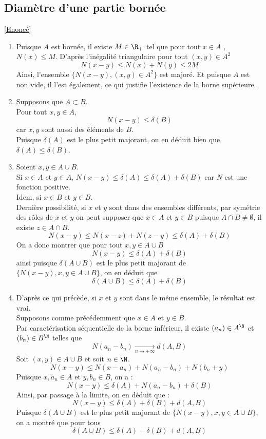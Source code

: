 \documentclass{book}
\begin{document}
	\subsection{Diamètre d'une partie bornée}\label{sec:diametre-dune-partie-bornee}
		\textcolor{blue}{\hyperref[Diamètre d'une partie bornée]{[Enoncé]}}\\
		\begin{enumerate}[leftmargin=*]
			\item Puisque $A$ est bornée, il existe $M\in\R_+$ tel que pour tout $x\in A$ , $N(x)\leq M$.
			D'après l'inégalité triangulaire pour tout $(x,y)\in A^2$
			\[N(x-y)\leq N(x) + N(y)\leq 2M\]
			Ainsi, l'ensemble $\{N(x-y), (x,y)\in A^2\}$ est majoré. Et puisque $A$ est non vide, il l'est également, ce qui justifie l'existence de la borne supérieure.
			\item Supposons que $A\subset B$.\\
			Pour tout $x,y\in A$, \[N(x-y)\leq \delta(B)\] car $x,y$ sont aussi des éléments de $B$.\\
			Puisque $\delta(A)$ est le plus petit majorant, on en déduit bien que $\delta(A)\leq\delta(B)$.
			\item 
			Soient $x,y\in A\cup B$.\\
			Si $x\in A$ et $y\in A$, $N(x-y)\leq \delta(A)\leq \delta(A)+\delta(B)$ car $N$ est une fonction positive.\\
			Idem, si $x\in B$ et $y\in B$.\\
			Dernière possibilité, si $x$ et $y$ sont dans des ensembles différents, par symétrie des rôles de $x$ et $y$ on peut supposer que $x\in A$ et $y\in B$
			 puisque $A\cap B\ne \emptyset$, il existe $z\in A\cap B$.\\
			\[N(x-y)\leq N(x-z)+N(z-y)\leq \delta(A)+\delta(B)\]
			On a donc montrer que pour tout $x,y\in A\cup B$ \[N(x-y)\leq \delta(A)+\delta(B)\]
			ainsi puisque $\delta(A\cup B)$ est le plus petit majorant de $\{N(x-y), x,y\in A\cup B \}$, on en déduit que \[\delta(A\cup B)\leq \delta(A)+\delta(B)\]
			\item 
			D'après ce qui précède, si $x$ et $y$ sont dans le même ensemble, le résultat est vrai.\\
			Supposons comme précédemment que $x\in A$ et $y\in B$.\\
			Par caractérisation séquentielle de la borne inférieur, il existe $(a_n)\in A^\N$ et $(b_n)\in B^\N$ telles que \[N(a_n-b_n)\underset{n\to+\infty}{\longrightarrow}d(A,B)\]
			Soit $(x,y)\in A\cup B$ et soit $n\in \N$.
			\[N(x-y)\leq N(x-a_n)+N(a_n-b_n)+N(b_n+y)\]
			Puisque $x, a_n\in A$ et $y,b_n\in B$, on a :
			\[N(x-y)\leq \delta(A)+N(a_n-b_n)+\delta(B)\]
			Ainsi, par passage à la limite, on en déduit que :
			\[N(x-y)\leq \delta(A)+\delta(B)+d(A,B)\]
			Puisque $\delta(A\cup B)$ est le plus petit majorant de $\{N(x-y), x,y\in A\cup B\}$, on a montré que pour tous 
			\[\delta(A\cup B)\leq \delta(A)+\delta(B)+d(A,B)\] 			
		\end{enumerate}
\end{document}
